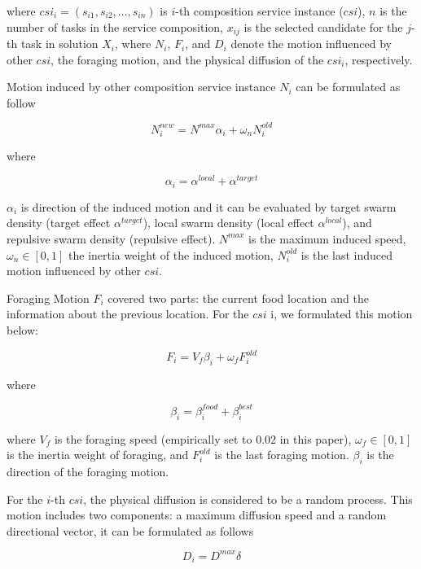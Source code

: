 \documentclass[10pt,journal,compsoc]{IEEEtran}
\begin{document}
where $csi_i = (s_{i1}, s_{i2}, . . . , s_{in})$ is $i$-th composition service instance ($csi$), $n$ is the number of tasks in the service composition, $x_{ij}$ is the selected candidate for the $j$-th task in solution $X_i$, where $N_i$, $F_i$, and $D_i$ denote the motion influenced by other $csi$, the foraging motion, and the physical diffusion of the $csi_i$, respectively.

Motion induced by other composition service instance $N_i$ can be formulated as follow

\begin{equation}
N^{new}_i = N^{max}\alpha_i + \omega_n N^{old}_i
\end{equation}

where

\begin{equation}
\alpha_i = \alpha^{local}+\alpha^{target}
\end{equation}

$\alpha_i$ is direction of the induced motion and it can be evaluated by target swarm density (target effect $\alpha^{target}$), local swarm density (local effect $\alpha^{local}$), and repulsive swarm density (repulsive effect). $N^{max}$ is the maximum induced speed, $\omega_n \in [0, 1]$ the inertia weight of the induced motion, $N^{old}_{i}$ is the last induced motion influenced by other $csi$.


Foraging Motion $F_i$ covered two parts: the current food location and the information about the previous location. For the $csi$ i, we formulated this motion below:

\begin{equation}
F_i = V_f\beta_i + \omega_f F^{old}_i
\end{equation}

where

\begin{equation}
\beta_i = \beta_i^{food}+\beta_i^{best}
\end{equation}

where $V_f$ is the foraging speed (empirically set to $0.02$ in this paper), $\omega_f∈ [0, 1]$ is the inertia weight of foraging, and $F^{old}_i$ is the last foraging motion. $\beta_i$ is the direction of the foraging motion.

For the $i$-th $csi$, the physical diffusion is considered to be a random process. This motion includes two components: a maximum diffusion speed and a random directional vector, it can be formulated as follows

\begin{equation}
D_i = D^{max}\delta
\end{equation}
\end{document}
